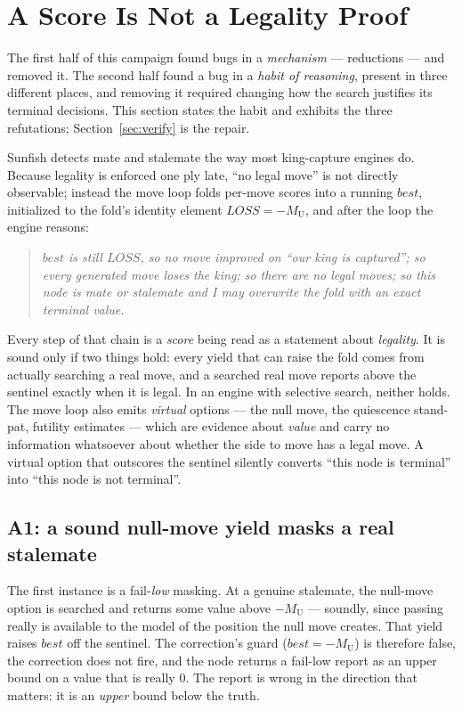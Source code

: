 \documentclass[11pt]{article}
\newcommand{\MU}{M_{\mathrm{U}}}    %
\newcommand{\LOSS}{\mathit{LOSS}}   %
\theoremstyle{plain}
\theoremstyle{definition}
\theoremstyle{remark}
\begin{document}
\section{A Score Is Not a Legality Proof}
\label{sec:refuted}

The first half of this campaign found bugs in a \emph{mechanism} ---
reductions --- and removed it.  The second half found a bug in a
\emph{habit of reasoning}, present in three different places, and
removing it required changing how the search justifies its terminal
decisions.  This section states the habit and exhibits the three
refutations; Section~\ref{sec:verify} is the repair.

Sunfish detects mate and stalemate the way most king-capture engines
do.  Because legality is enforced one ply late, ``no legal move'' is
not directly observable; instead the move loop folds per-move scores
into a running $\mathit{best}$, initialized to the fold's identity
element $\LOSS = -\MU$, and after the loop the engine reasons:

\begin{quote}
\emph{$\mathit{best}$ is still $\LOSS$, so no move improved on ``our
king is captured''; so every generated move loses the king; so there
are no legal moves; so this node is mate or stalemate and I may
overwrite the fold with an exact terminal value.}
\end{quote}

Every step of that chain is a \emph{score} being read as a statement
about \emph{legality}.  It is sound only if two things hold: every
yield that can raise the fold comes from actually searching a real
move, and a searched real move reports above the sentinel exactly when
it is legal.  In an engine with selective search, neither holds.  The
move loop also emits \emph{virtual} options --- the null move, the
quiescence stand-pat, futility estimates --- which are evidence about
\emph{value} and carry no information whatsoever about whether the side
to move has a legal move.  A virtual option that outscores the sentinel
silently converts ``this node is terminal'' into ``this node is not
terminal''.

\subsection{A1: a sound null-move yield masks a real stalemate}
\label{sec:a1}

The first instance is a fail-\emph{low} masking.  At a genuine
stalemate, the null-move option is searched and returns some value
above $-\MU$ --- soundly, since passing really is available to the
model of the position the null move creates.  That yield raises
$\mathit{best}$ off the sentinel.  The correction's guard
($\mathit{best} = -\MU$) is therefore false, the correction does not
fire, and the node returns a fail-low report as an upper bound on a
value that is really $0$.  The report is wrong in the direction that
matters: it is an \emph{upper} bound below the truth.
\end{document}
